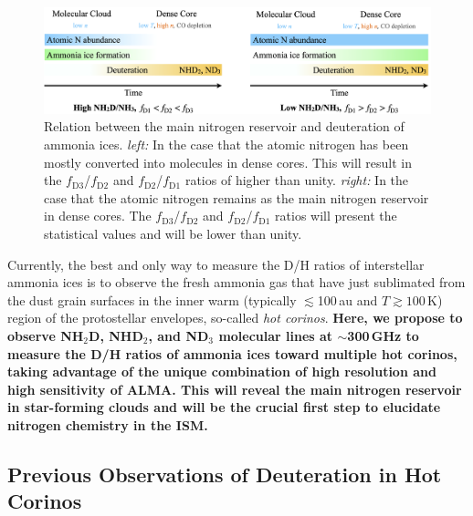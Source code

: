 \documentclass[12pt,a4paper]{article}  %
\begin{document}
\begin{figure}[th]
    \centering
    \includegraphics[width=\textwidth]{ammonia_deuteration_cartoon_no_schemfig_ver2.png}
    \caption{Relation between the main nitrogen reservoir and deuteration of ammonia ices. \textit{left:} In the case that the atomic nitrogen has been mostly converted into molecules in dense cores. This will result in the $f_\mathrm{D3}$/$f_\mathrm{D2}$ and $f_\mathrm{D2}$/$f_\mathrm{D1}$ ratios of higher than unity. \textit{right:} In the case that the atomic nitrogen remains as the main nitrogen reservoir in dense cores. The $f_\mathrm{D3}$/$f_\mathrm{D2}$ and $f_\mathrm{D2}$/$f_\mathrm{D1}$ ratios will present the statistical values and will be lower than unity.}
    \label{fig:ammonia_deuteration}
\end{figure}

\smallskip
\noindent Currently, the best and only way to measure the D/H ratios of interstellar ammonia ices is to observe the fresh ammonia gas that have just sublimated from the dust grain surfaces in the inner warm (typically $\lesssim$100\,au and $T\gtrsim100$\,K) region of the protostellar envelopes, so-called \textit{hot corinos}. \textbf{Here, we propose to observe NH$_2$D, NHD$_2$, and ND$_3$ molecular lines at $\sim$300\,GHz to measure the D/H ratios of ammonia ices toward multiple hot corinos, taking advantage of the unique combination of high resolution and high sensitivity of ALMA. This will reveal the main nitrogen reservoir in star-forming clouds and will be the crucial first step to elucidate nitrogen chemistry in the ISM.}

\subsection{Previous Observations of Deuteration in Hot Corinos}

\end{document}
